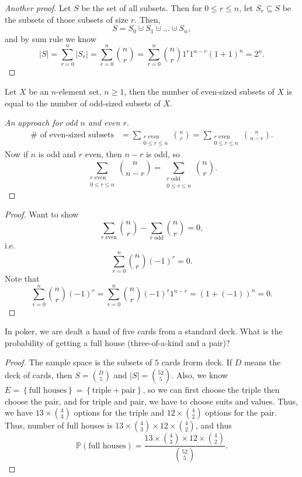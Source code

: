 \begin{proof}[Another proof]
    Let \(S\) be the set of all subsets. Then for \(0 \le r \le n\), let \(S_r \subseteq S\) be the subsets of those subsets of size \(r\). Then, 
    \[
        S = S_0 \cupdot S_1 \cupdot \dots \cupdot S_n,
    \]   
    and by sum rule we know 
    \[
        \vert S \vert = \sum_{r=0}^n \vert S_r \vert = \sum_{r=0}^n \binom{n}{r} = \sum_{r=0}^n \binom{n}{r} 1^r 1^{n-r} (1 + 1)^n = 2^n .    
    \]
\end{proof}

\begin{corollary}
    Let \(X\) be an \(n\)-element set, \(n \ge 1\), then the number of even-sized subsets of \(X\) is equal to the number of odd-sized subsets of \(X\).     
\end{corollary}
\begin{proof}[An approach for odd \(n\) and even \(r\)]
    \begin{align*}
        \# \text{ of even-sized subsets} &= \sum_{\substack{r \text{ even} \\ 0 \le r \le n }} \binom{n}{r} = \sum_{\substack{r \text{ even} \\ 0 \le r \le n }}  \binom{n}{n-r}.  
    \end{align*}
    Now if \(n\) is odd and \(r\) even, then \(n - r\) is odd, so 
    \[
       \sum_{\substack{r \text{ even} \\ 0 \le r \le n }}  \binom{n}{n-r} = \sum_{\substack{r \text{ odd} \\ 0 \le r \le n }}  \binom{n}{r}. 
    \]   
\end{proof}
\begin{proof}
    Want to show 
    \[
        \sum_{r \text{ even}} \binom{n}{r} - \sum_{r \text{ odd} } \binom{n}{r} = 0,  
    \]
    i.e. 
    \[
        \sum_{r=0}^n \binom{n}{r} (-1)^r = 0. 
    \]
    Note that 
    \[
        \sum_{r=0}^n \binom{n}{r} (-1)^r = \sum_{r=0}^n \binom{n}{r} (-1)^r 1^{n-r} = (1 + (-1))^n = 0. 
    \]
\end{proof}

\begin{eg}
    In poker, we are dealt a hand of five cards from a standard deck. What is the probability of getting a full house (three-of-a-kind and a pair)?
\end{eg}
\begin{proof}
    The sample space is the subsets of \(5\) cards frorm deck. If \(D\) means the deck of cards, then \(S = \binom{D}{5}\) and \(\vert S \vert = \binom{52}{5} \). Also, we know \(E = \left\{ \text{full houses}  \right\} = \left\{ \text{triple} + \text{pair}   \right\} \), so we can first choose the triple then choose the pair, and for triple and pair, we have to choose suits and values. Thus, we have \(13 \times \binom{4}{3}\) options for the triple and \(12 \times \binom{4}{2}\) options for the pair. Thus, number of full houses is \(13 \times \binom{4}{3}\times  12 \times \binom{4}{2}\), and thus 
    \[
        \mathbb{P} (\text{full houses} ) = \frac{13 \times \binom{4}{3} \times 12 \times \binom{4}{2}}{\binom{52}{5}}.
    \]     
\end{proof}


